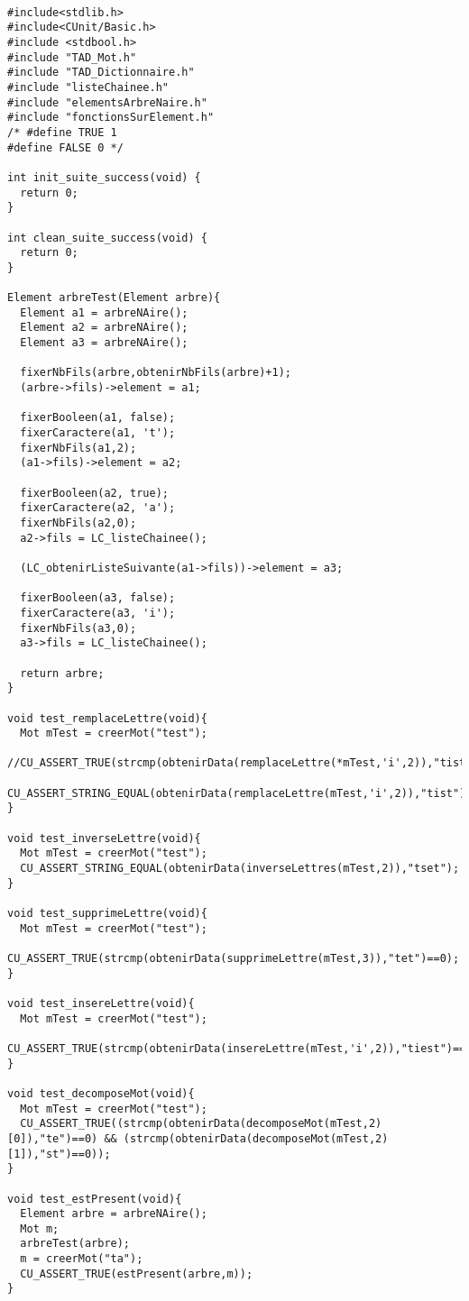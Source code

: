 \documentclass{report}
\begin{document}
 
\begin{lstlisting}

#include<stdlib.h>
#include<CUnit/Basic.h>
#include <stdbool.h>
#include "TAD_Mot.h"
#include "TAD_Dictionnaire.h"
#include "listeChainee.h"
#include "elementsArbreNaire.h"
#include "fonctionsSurElement.h"
/* #define TRUE 1
#define FALSE 0 */

int init_suite_success(void) { 
  return 0; 
}

int clean_suite_success(void) { 
  return 0; 
}

Element arbreTest(Element arbre){
  Element a1 = arbreNAire();
  Element a2 = arbreNAire();
  Element a3 = arbreNAire();
  
  fixerNbFils(arbre,obtenirNbFils(arbre)+1);
  (arbre->fils)->element = a1;
  
  fixerBooleen(a1, false);
  fixerCaractere(a1, 't');
  fixerNbFils(a1,2); 
  (a1->fils)->element = a2;

  fixerBooleen(a2, true);
  fixerCaractere(a2, 'a');
  fixerNbFils(a2,0);
  a2->fils = LC_listeChainee(); 
  
  (LC_obtenirListeSuivante(a1->fils))->element = a3;

  fixerBooleen(a3, false);
  fixerCaractere(a3, 'i');
  fixerNbFils(a3,0);
  a3->fils = LC_listeChainee();

  return arbre;
}
  
void test_remplaceLettre(void){
  Mot mTest = creerMot("test");
  //CU_ASSERT_TRUE(strcmp(obtenirData(remplaceLettre(*mTest,'i',2)),"tist")==0);
  CU_ASSERT_STRING_EQUAL(obtenirData(remplaceLettre(mTest,'i',2)),"tist");
}

void test_inverseLettre(void){
  Mot mTest = creerMot("test");
  CU_ASSERT_STRING_EQUAL(obtenirData(inverseLettres(mTest,2)),"tset");
}

void test_supprimeLettre(void){
  Mot mTest = creerMot("test");
  CU_ASSERT_TRUE(strcmp(obtenirData(supprimeLettre(mTest,3)),"tet")==0);
}

void test_insereLettre(void){
  Mot mTest = creerMot("test");
  CU_ASSERT_TRUE(strcmp(obtenirData(insereLettre(mTest,'i',2)),"tiest")==0);
}

void test_decomposeMot(void){
  Mot mTest = creerMot("test");
  CU_ASSERT_TRUE((strcmp(obtenirData(decomposeMot(mTest,2)[0]),"te")==0) && (strcmp(obtenirData(decomposeMot(mTest,2)[1]),"st")==0));
}

void test_estPresent(void){
  Element arbre = arbreNAire();
  Mot m;
  arbreTest(arbre);
  m = creerMot("ta");
  CU_ASSERT_TRUE(estPresent(arbre,m));
}


\end{lstlisting}
\end{document}

